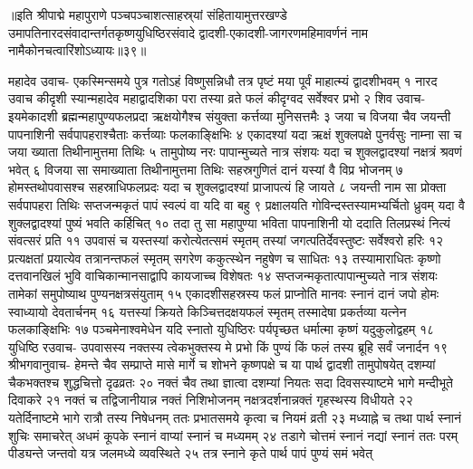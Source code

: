 ॥इति श्रीपाद्मे महापुराणे पञ्चपञ्चाशत्साहस्र्यां संहितायामुत्तरखण्डे उमापतिनारदसंवादान्तर्गतकृष्णयुधिष्ठिरसंवादे द्वादशी-एकादशी-जागरणमहिमावर्णनं नाम नामैकोनचत्वारिंशोऽध्यायः॥३९॥




महादेव उवाच-
एकस्मिन्समये पुत्र गतोऽहं विष्णुसन्निधौ 
तत्र पृष्टं मया पूर्वं माहात्म्यं द्वादशीभवम् १
नारद उवाच
कीदृशी स्यान्महादेव महाद्वादशिका परा 
तस्या व्रते फलं कीदृग्वद सर्वेश्वर प्रभो २
शिव उवाच-
इयमेकादशी ब्रह्मन्महापुण्यफलप्रदा 
ऋक्षयोगैश्च संयुक्ता कर्त्तव्या मुनिसत्तमैः ३
जया च विजया चैव जयन्ती पापनाशिनी 
सर्वपापहराश्चैताः कर्त्तव्याः फलकाङ्क्षिभिः ४
एकादश्यां यदा ऋक्षं शुक्लपक्षे पुनर्वसुः 
नाम्ना सा च जया ख्याता तिथीनामुत्तमा तिथिः ५
तामुपोष्य नरः पापान्मुच्यते नात्र संशयः 
यदा च शुक्लद्वादश्यां नक्षत्रं श्रवणं भवेत् ६
विजया सा समाख्याता तिथीनामुत्तमा तिथिः 
सहस्रगुणितं दानं यस्यां वै विप्र भोजनम् ७
होमस्तथोपवासश्च सहस्राधिफलप्रदः 
यदा च शुक्लद्वादश्यां प्राजापत्यं हि जायते ८
जयन्ती नाम सा प्रोक्ता सर्वपापहरा तिथिः 
सप्तजन्मकृतं पापं स्वल्पं वा यदि वा बहु ९
प्रक्षालयति गोविन्दस्तस्यामभ्यर्चितो ध्रुवम् 
यदा वै शुक्लद्वादश्यां पुष्यं भवति कर्हिचित् १०
तदा तु सा महापुण्या भविता पापनाशिनी 
यो ददाति तिलप्रस्थं नित्यं संवत्सरं प्रति ११
उपवासं च यस्तस्यां करोत्येतत्समं स्मृतम् 
तस्यां जगत्पतिर्देवस्तुष्टः सर्वेश्वरो हरिः १२
प्रत्यक्षतां प्रयात्येव तत्रानन्तफलं स्मृतम् 
सगरेण ककुत्स्थेन नहुषेण च साधितः १३
तस्यामाराधितः कृष्णो दत्तवानखिलं भुवि 
वाचिकान्मानसाद्वापि कायजाच्च विशेषतः १४
सप्तजन्मकृतात्पापान्मुच्यते नात्र संशयः 
तामेकां समुपोष्याथ पुण्यनक्षत्रसंयुताम् १५
एकादशीसहस्रस्य फलं प्राप्नोति मानवः 
स्नानं दानं जपो होमः स्वाध्यायो देवतार्चनम् १६
यत्तस्यां क्रियते किञ्चित्तदक्षयफलं स्मृतम् 
तस्मादेषा प्रकर्तव्या यत्नेन फलकाङ्क्षिभिः १७
पञ्चमेनाश्वमेधेन यदि स्नातो युधिष्ठिरः 
पर्यपृच्छत धर्मात्मा कृष्णं यदुकुलोद्वहम् १८
युधिष्ठि रउवाच-
उपवासस्य नक्तस्य त्वेकभुक्तस्य मे प्रभो 
किं पुण्यं किं फलं तस्य ब्रूहि सर्वं जनार्दन १९
श्रीभगवानुवाच-
हेमन्ते चैव सम्प्राप्ते मासे मार्गे च शोभने 
कृष्णपक्षे च या पार्थ द्वादशी तामुपोषयेत् 
दशम्यां चैकभक्तश्च शुद्धचित्तो दृढव्रतः २०
नक्तं चैव तथा ज्ञात्वा दशम्यां नियतः सदा 
दिवसस्याष्टमे भागे मन्दीभूते दिवाकरे २१
नक्तं च तद्विजानीयान्न नक्तं निशिभोजनम् 
नक्षत्रदर्शनान्नक्तं गृहस्थस्य विधीयते २२
यतेर्दिनाष्टमे भागे रात्रौ तस्य निषेधनम् 
ततः प्रभातसमये कृत्वा च नियमं व्रती २३
मध्याह्ने च तथा पार्थ स्नानं शुचिः समाचरेत् 
अधमं कूपके स्नानं वाप्यां स्नानं च मध्यमम् २४
तडागे चोत्तमं स्नानं नद्यां स्नानं ततः परम् 
पीड्यन्ते जन्तवो यत्र जलमध्ये व्यवस्थिते २५
तत्र स्नाने कृते पार्थ पापं पुण्यं समं भवेत् 
